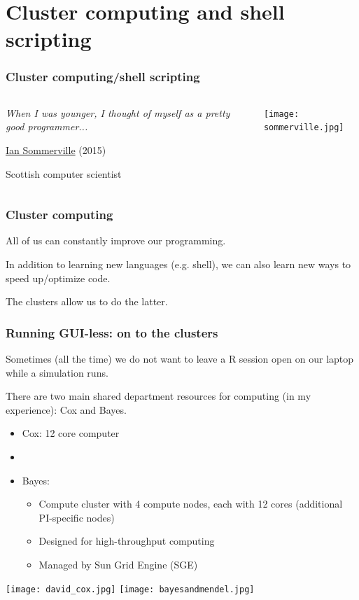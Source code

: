 \documentclass[12pt, 
hyperref={colorlinks=true, linkcolor=blue, urlcolor=cyan}]{beamer}
\newcommand{\myframe}[1]{\begin{frame} \frametitle{#1}}
\begin{document}
\section{Cluster computing and shell scripting}
\myframe{Cluster computing/shell scripting}
\begin{columns}[c]
\begin{column}{.66\textwidth}
\vspace{1cm}

\emph{When I was younger, I thought of myself as a pretty good programmer...}

\vspace{2cm}
\href{http://www.software-engin.com/}{Ian Sommerville} (2015)

Scottish computer scientist
\end{column}
\begin{column}{.33\textwidth}
\texttt{[image: sommerville.jpg]}
\end{column}
\end{columns}
\end{frame}

\myframe{Cluster computing}
All of us can constantly improve our programming.

In addition to learning new languages (e.g. shell), we can also learn new ways to speed up/optimize code.

The clusters allow us to do the latter.
\end{frame}

\myframe{Running GUI-less: on to the clusters}
Sometimes (all the time) we do not want to leave a R session open on our laptop while a simulation runs.

There are two main shared department resources for computing (in my experience): Cox and Bayes.

\begin{itemize}
\item Cox: 12 core computer 
\item[]
\item Bayes: 
\begin{itemize}
\item Compute cluster with 4 compute nodes, each with 12 cores (additional PI-specific nodes)
\item Designed for high-throughput computing
\item Managed by Sun Grid Engine (SGE)
\end{itemize}
\end{itemize}
\centering
\texttt{[image: david\_cox.jpg]}\hspace{1cm} \texttt{[image: bayesandmendel.jpg]}
\end{frame}
\end{document}
